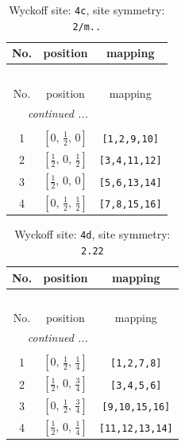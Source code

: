 \documentclass[fleqn,8pt]{jsarticle}
\begin{document}
\renewcommand{\arraystretch}{1.2}
\begin{longtable}{ccc}
\caption{Wyckoff site: {\tt 4c}, site symmetry: {\tt 2/m..}}
 \\
 \hline \hline
No. & position & mapping \\ \hline \endfirsthead

\multicolumn{2}{l}{\tablename\ \thetable{}} \\
 \hline \hline
No. & position & mapping \\ \hline \endhead

 \hline \hline
\multicolumn{2}{r}{\footnotesize\it continued ...} \\ \endfoot

 \hline \hline
\multicolumn{2}{r}{} \\ \endlastfoot

1 & $\left[ 0,\, \frac{1}{2},\, 0 \right]$ & {\tt [1,2,9,10]} \\ \hline
2 & $\left[ \frac{1}{2},\, 0,\, \frac{1}{2} \right]$ & {\tt [3,4,11,12]} \\ \hline
3 & $\left[ \frac{1}{2},\, 0,\, 0 \right]$ & {\tt [5,6,13,14]} \\ \hline
4 & $\left[ 0,\, \frac{1}{2},\, \frac{1}{2} \right]$ & {\tt [7,8,15,16]} \\
\end{longtable}
\renewcommand{\arraystretch}{1.2}
\begin{longtable}{ccc}
\caption{Wyckoff site: {\tt 4d}, site symmetry: {\tt 2.22}}
 \\
 \hline \hline
No. & position & mapping \\ \hline \endfirsthead

\multicolumn{2}{l}{\tablename\ \thetable{}} \\
 \hline \hline
No. & position & mapping \\ \hline \endhead

 \hline \hline
\multicolumn{2}{r}{\footnotesize\it continued ...} \\ \endfoot

 \hline \hline
\multicolumn{2}{r}{} \\ \endlastfoot

1 & $\left[ 0,\, \frac{1}{2},\, \frac{1}{4} \right]$ & {\tt [1,2,7,8]} \\ \hline
2 & $\left[ \frac{1}{2},\, 0,\, \frac{3}{4} \right]$ & {\tt [3,4,5,6]} \\ \hline
3 & $\left[ 0,\, \frac{1}{2},\, \frac{3}{4} \right]$ & {\tt [9,10,15,16]} \\ \hline
4 & $\left[ \frac{1}{2},\, 0,\, \frac{1}{4} \right]$ & {\tt [11,12,13,14]} \\
\end{longtable}
\end{document}
